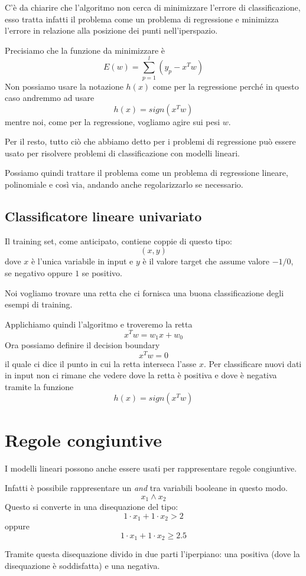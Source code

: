 C'\`e da chiarire che l'algoritmo non cerca di minimizzare l'errore di classificazione, esso tratta infatti il problema
come un problema di regressione e minimizza l'errore in relazione alla posizione dei punti nell'iperspazio.

Precisiamo che la funzione da minimizzare \`e
\[ E(w) = \sum_{p = 1}^l (y_p - x^T w) \]
Non possiamo usare la notazione $h(x)$ come per la regressione perch\'e in questo caso andremmo ad usare
\[ h(x) = sign(x^T w) \]
mentre noi, come per la regressione, vogliamo agire sui pesi $w$.

Per il resto, tutto ci\`o che abbiamo detto per i problemi di regressione pu\`o essere usato per risolvere problemi di
classificazione con modelli lineari.

Possiamo quindi trattare il problema come un problema di regressione lineare, polinomiale e cos\`i via, andando anche
regolarizzarlo se necessario.

\subsection{Classificatore lineare univariato}
Il training set, come anticipato, contiene coppie di questo tipo:
\[ (x, y) \]
dove $x$ \`e l'unica variabile in input e $y$ \`e il valore target che assume valore $-1/0$, se negativo oppure $1$ se
positivo.

Noi vogliamo trovare una retta che ci fornisca una buona classificazione degli esempi di training.

Applichiamo quindi l'algoritmo e troveremo la retta
\[ x^T w = w_1 x + w_0 \]
Ora possiamo definire il decision boundary
\[ x^T w = 0 \]
il quale ci dice il punto in cui la retta interseca l'asse $x$. Per classificare nuovi dati in input non ci rimane che
vedere dove la retta \`e positiva e dove \`e negativa tramite la funzione
\[ h(x) = sign(x^T w) \]

\section{Regole congiuntive}
I modelli lineari possono anche essere usati per rappresentare regole congiuntive.

Infatti \`e possibile rappresentare un \emph{and} tra variabili booleane in questo modo.
\[ x_1 \wedge x_2 \]
Questo si converte in una disequazione del tipo:
\[ 1 \cdot x_1 + 1 \cdot x_2 > 2 \]
oppure
\[ 1 \cdot x_1 + 1 \cdot x_2 \geq 2.5 \]

Tramite questa disequazione divido in due parti l'iperpiano: una positiva (dove la disequazione \`e soddisfatta) e una
negativa.

